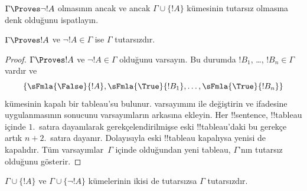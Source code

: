 \documentclass[../../../include/open-logic-section]{subfiles}
\begin{document}
\begin{prob}
$\Gamma \Proves \lnot !A$ olmasının ancak ve ancak
$\Gamma \cup \{!A\}$ kümesinin tutarsız olmasına denk olduğunu ispatlayın.
\end{prob}

\begin{prop}
  $\Gamma \Proves !A$ ve $\lnot !A \in \Gamma$ ise $\Gamma$ tutarsızdır.
\end{prop}

\begin{proof}
  $\Gamma \Proves !A$ ve $\lnot !A \in \Gamma$ olduğunu varsayın. Bu
  durumda $!B_1$, \dots, $!B_n \in \Gamma$ vardır ve
  \[
  \{\sFmla{\False}{!A}, \sFmla{\True}{!B_1}, \dots, \sFmla{\True}{!B_n}\}
  \]
  kümesinin kapalı bir tableau'su bulunur.  varsayımını
   ile değiştirin ve
   ifadesine \TRule{\True}{\lnot} uygulanmasının
  sonucunu varsayımların arkasına ekleyin. Her !!{sentence}, !!{tableau}
  içinde $1$.~satıra dayanılarak gerekçelendirilmişse eski !!{tableau}'daki
  bu gerekçe artık $n+2$.~satıra dayanır. Dolayısıyla eski !!{tableau}
  kapalıysa yenisi de kapalıdır. Tüm varsayımlar~$\Gamma$ içinde olduğundan
  yeni tableau, $\Gamma$'nın tutarsız olduğunu gösterir.
\end{proof}

\begin{prop}
  $\Gamma \cup \{!A\}$ ve $\Gamma \cup \{\lnot !A\}$ kümelerinin ikisi de
  tutarsızsa $\Gamma$ tutarsızdır.
\end{prop}
\end{document}
